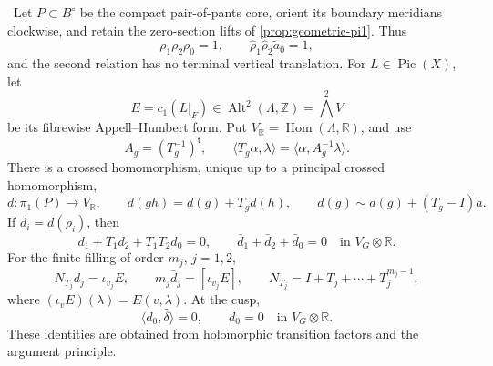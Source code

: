 \begin{proposition}
\label{prop:analytic-ah-boundary}
\Verified\ Let \(P\subset B^\circ\) be the compact pair-of-pants core,
orient its boundary meridians clockwise, and retain the zero-section lifts
of \cref{prop:geometric-pi1}.  Thus
\[
 \rho_1\rho_2\rho_0=1,
 \qquad
 \widehat\rho_1\widehat\rho_2\widetilde a_0=1,
\tag{5.17-A1}
\]
and the second relation has no terminal vertical translation.  For
\(L\in\operatorname{Pic}(X)\), let
\[
 E=c_1(L|_F)\in\operatorname{Alt}^2(\Lambda,\mathbb Z)
   =\bigwedge^2V
\]
be its fibrewise Appell--Humbert form.  Put
\(V_{\mathbb R}=\operatorname{Hom}(\Lambda,\mathbb R)\), and use
\[
 A_g=(T_g^{-1})^{\mathsf t},
 \qquad
 \langle T_g\alpha,\lambda\rangle
 =\langle\alpha,A_g^{-1}\lambda\rangle.
\tag{5.17-A2}
\]
There is a crossed homomorphism, unique up to a principal crossed
homomorphism,
\[
 d:\pi_1(P)\longrightarrow V_{\mathbb R},
 \qquad
 d(gh)=d(g)+T_gd(h),
 \qquad
 d(g)\sim d(g)+(T_g-I)a.
\tag{5.17-A3}
\]
If \(d_i=d(\rho_i)\), then
\[
 d_1+T_1d_2+T_1T_2d_0=0,
 \qquad
 \bar d_1+\bar d_2+\bar d_0=0
 \quad\text{in }V_G\otimes\mathbb R.
\tag{5.17-A4}
\]
For the finite filling of order \(m_j\), \(j=1,2\),
\[
 N_{T_j}d_j=\iota_{v_j}E,
 \qquad
 m_j\bar d_j=[\iota_{v_j}E],
 \qquad
 N_{T_j}=I+T_j+\cdots+T_j^{m_j-1},
\tag{5.17-A5}
\]
where \((\iota_vE)(\lambda)=E(v,\lambda)\).  At the cusp,
\[
 \langle d_0,\widehat\delta\rangle=0,
 \qquad
 \bar d_0=0\quad\text{in }V_G\otimes\mathbb R.
\tag{5.17-A6}
\]
These identities are obtained from holomorphic transition factors and the
argument principle.
\end{proposition}

